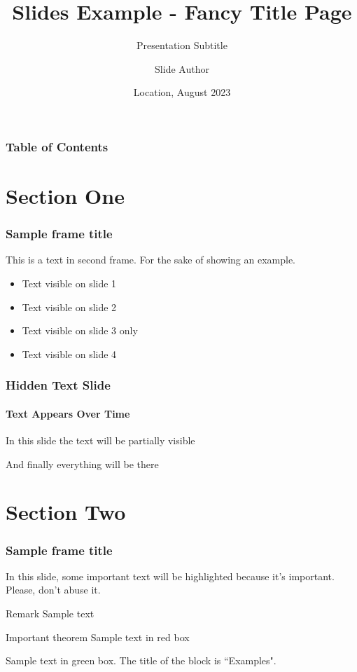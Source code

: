 \documentclass[aspectratio=1610]{beamer}
\title[Slides Example - Fancy Title Page] %
{Slides Example - Fancy Title Page}
\subtitle{Presentation Subtitle}
\author[Author, Slide] %
{Slide Author\inst{1}}
\institute[Institutional Affiliation] %
{
  \inst{1}%
  Institutional Affiliation
}
\date[2023.08] %
{Location, August 2023}
\begin{document}
\frame[b,nittanytitle]{\titlepage}

\begin{frame}
\frametitle{Table of Contents}
\tableofcontents
\end{frame}


\section{Section One}

\begin{frame}
\frametitle{Sample frame title}
This is a text in second frame. For the sake of showing an example.

\begin{itemize}
    \item<1-> Text visible on slide 1
    \item<2-> Text visible on slide 2
    \item<3> Text visible on slide 3 only
    \item<4-> Text visible on slide 4
\end{itemize}
\end{frame}


\begin{frame}
\frametitle{Hidden Text Slide}
\framesubtitle{Text Appears Over Time}
In this slide \pause
the text will be partially visible \pause

And finally everything will be there
\end{frame}

\section{Section Two}

\begin{frame}
\frametitle{Sample frame title}
In this slide, some important text will be
\alert{highlighted} because it's important.
Please, don't abuse it.

\begin{block}{Remark}
Sample text
\end{block}

\begin{alertblock}{Important theorem}
Sample text in red box
\end{alertblock}

\begin{examples}
Sample text in green box. The title of the block is ``Examples".
\end{examples}
\end{frame}
\end{document}
